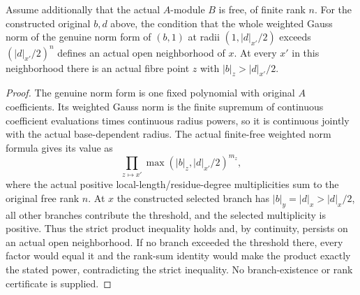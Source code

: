 \begin{lemma}
\label{spectrum:finite-free-norm-branch-detection}
Assume additionally that the actual $A$-module $B$ is free, of finite
rank $n$. For the constructed original $b,d$ above, the condition
that the whole weighted Gauss norm of the genuine norm form of
$(b,1)$ at radii $(1,|d|_{x'}/2)$ exceeds $(|d|_{x'}/2)^n$
defines an actual open neighborhood of $x$. At every $x'$ in this
neighborhood there is an actual fibre point $z$ with
$|b|_z>|d|_{x'}/2$.
\leanok
\end{lemma}
\begin{proof}
The genuine norm form is one fixed polynomial with original $A$
coefficients. Its weighted Gauss norm is the finite supremum of
continuous coefficient evaluations times continuous radius powers,
so it is continuous jointly with the actual base-dependent radius.
The actual finite-free weighted norm formula gives its value as
\[
 \prod_{z\mapsto x'}\max(|b|_z,|d|_{x'}/2)^{m_z},
\]
where the actual positive local-length/residue-degree multiplicities
sum to the original free rank $n$. At $x$ the constructed selected
branch has $|b|_y=|d|_x>|d|_x/2$, all other branches contribute the
threshold, and the selected multiplicity is positive. Thus the
strict product inequality holds and, by continuity, persists on an
actual open neighborhood. If no branch exceeded the threshold there,
every factor would equal it and the rank-sum identity would make the
product exactly the stated power, contradicting the strict inequality.
No branch-existence or rank certificate is supplied.
\end{proof}

